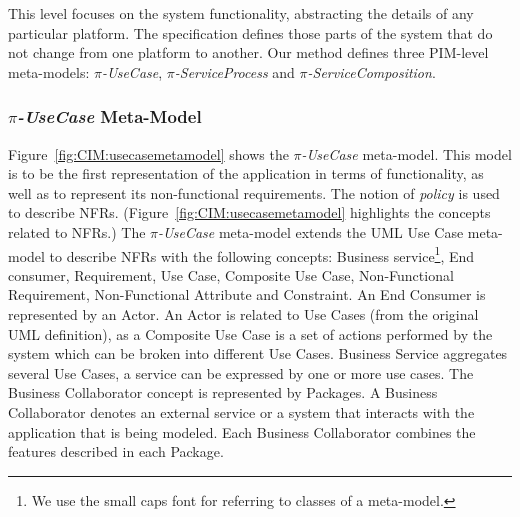 \documentclass{singlecol-new}
\theoremstyle{TH}{
\newtheorem{lemma}{Lemma}
\newtheorem{theorem}[lemma]{Theorem}
\newtheorem{corrolary}[lemma]{Corrolary}
\newtheorem{conjecture}[lemma]{Conjecture}
\newtheorem{proposition}[lemma]{Proposition}
\newtheorem{claim}[lemma]{Claim}
\newtheorem{stheorem}[lemma]{Wrong Theorem}
\newtheorem{algorithm}{Algorithm}
}
\theoremstyle{THrm}{
\newtheorem{definition}{Definition}[section]
\newtheorem{question}{Question}[section]
\newtheorem{remark}{Remark}
\newtheorem{scheme}{Scheme}
}
\theoremstyle{THhit}{
\newtheorem{case}{Case}[section]
}
\theoremstyle{THhsl}{
\newtheorem{example}{Example}
}
\begin{document}
This level focuses on the system functionality, abstracting the details of any particular platform.
The specification defines those parts of the system that do not change from one platform to another.
Our method defines three PIM-level meta-models: \textit{$\pi$-UseCase}, \textit{$\pi$-Ser\-vice\-Pro\-cess} and \textit{$\pi$-ServiceComposition}.

\subsubsection{\textit{$\pi$-UseCase} Meta-Model}%

Figure~\ref{fig:CIM:usecasemetamodel} shows the \textit{$\pi$-UseCase} meta-model.
This model is  to be the first representation of the application in terms of functionality, as well as to represent its non-func\-tion\-al requirements.
The notion of \textit{policy} is used to describe NFRs.
(Figure~\ref{fig:CIM:usecasemetamodel} highlights the concepts related to NFRs.)
The \textit{$\pi$-UseCase} meta-model extends the UML Use Case meta-model to describe NFRs with  the following  concepts:  {\sc Business service}\footnote{We use the {\sc small caps} font for referring to classes of a meta-model.}, {\sc End consumer}, {\sc Requirement}, {\sc Use Case}, {\sc Composite Use Case}, {\sc Non-\-Func\-tion\-al Requirement}, {\sc Non-Functional} {\sc At\-tri\-bute} and {\sc Constraint}.
An {\sc End Consumer} is represented by an {\sc Actor}.
An  {\sc Actor} is related to {\sc Use Cases} (from the original UML definition), as a {\sc  Composite Use Case} is a set of actions performed by the system which can be broken into different {\sc Use Cases}.
{\sc  Business Service} aggregates several {\sc Use Cases},  a service can be expressed by one or more use cases.
 The {\sc Business Collaborator} concept is represented  by {\sc Packages}.
A {\sc Business Collaborator} denotes an external service or a system that interacts with the application that is being modeled.
Each {\sc Business Collaborator} combines the features described in each  {\sc Package}.
\end{document}
